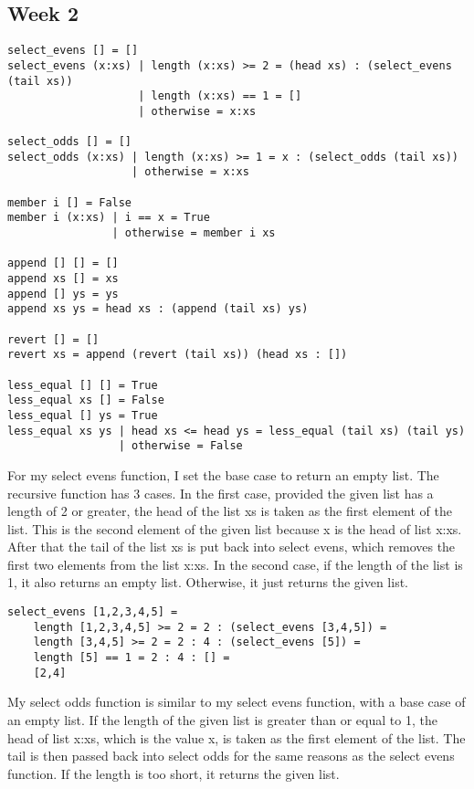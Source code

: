 \documentclass{article}
\theoremstyle{theorem}
\theoremstyle{definition}
\theoremstyle{remark}
\begin{document}
\subsection{Week 2}

\begin{lstlisting}
select_evens [] = []
select_evens (x:xs) | length (x:xs) >= 2 = (head xs) : (select_evens (tail xs))
                    | length (x:xs) == 1 = []
                    | otherwise = x:xs

select_odds [] = []
select_odds (x:xs) | length (x:xs) >= 1 = x : (select_odds (tail xs))
                   | otherwise = x:xs

member i [] = False
member i (x:xs) | i == x = True
                | otherwise = member i xs

append [] [] = []
append xs [] = xs
append [] ys = ys
append xs ys = head xs : (append (tail xs) ys)

revert [] = []
revert xs = append (revert (tail xs)) (head xs : [])

less_equal [] [] = True
less_equal xs [] = False
less_equal [] ys = True
less_equal xs ys | head xs <= head ys = less_equal (tail xs) (tail ys)
                 | otherwise = False
\end{lstlisting}
%
For my select evens function, I set the base case to return an empty list. The recursive function has 3 cases. In the first case, provided the given list has a length of 2 or greater, the head of the list xs is taken as the first element of the list. This is the second element of the given list because x is the head of list x:xs. After that the tail of the list xs is put back into select evens, which removes the first two elements from the list x:xs. In the second case, if the length of the list is 1, it also returns an empty list. Otherwise, it just returns the given list.

\begin{lstlisting}
select_evens [1,2,3,4,5] =
	length [1,2,3,4,5] >= 2 = 2 : (select_evens [3,4,5]) =
	length [3,4,5] >= 2 = 2 : 4 : (select_evens [5]) =
	length [5] == 1 = 2 : 4 : [] =
	[2,4]
\end{lstlisting}

\medskip\noindent
My select odds function is similar to my select evens function, with a base case of an empty list. If the length of the given list is greater than or equal to 1, the head of list x:xs, which is the value x, is taken as the first element of the list. The tail is then passed back into select odds for the same reasons as the select evens function. If the length is too short, it returns the given list.
\end{document}
